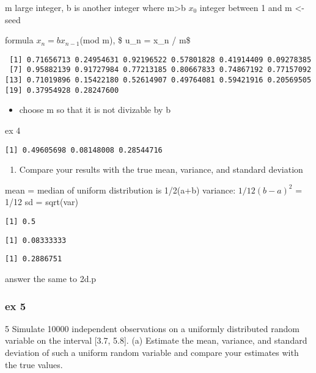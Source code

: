 \documentclass[
  letterpaper,
  DIV=11,
  numbers=noendperiod]{scrreprt}
\providecommand{\tightlist}{%
  \setlength{\itemsep}{0pt}\setlength{\parskip}{0pt}}\usepackage{longtable,booktabs,array}
\begin{document}
m large integer, b is another integer where m\textgreater b \(x_0\)
integer between 1 and m \textless- seed

formula \(x_n = bx_{n-1}\)(mod m), \$ u\_n = x\_n / m\$

\begin{verbatim}
 [1] 0.71656713 0.24954631 0.92196522 0.57801828 0.41914409 0.09278385
 [7] 0.95882139 0.91727984 0.77213185 0.80667833 0.74867192 0.77157092
[13] 0.71019896 0.15422180 0.52614907 0.49764081 0.59421916 0.20569505
[19] 0.37954928 0.28247600
\end{verbatim}

\begin{itemize}
\tightlist
\item
  choose m so that it is not divizable by b
\end{itemize}

ex 4

\begin{verbatim}
[1] 0.49605698 0.08148008 0.28544716
\end{verbatim}

\begin{enumerate}
\def\labelenumi{(\alph{enumi})}
\setcounter{enumi}{1}
\tightlist
\item
  Compare your results with the true mean, variance, and standard
  deviation
\end{enumerate}

mean = median of uniform distribution is 1/2(a+b) variance:
\(1/12(b-a)^2\) = 1/12 sd = sqrt(var)

\begin{verbatim}
[1] 0.5
\end{verbatim}

\begin{verbatim}
[1] 0.08333333
\end{verbatim}

\begin{verbatim}
[1] 0.2886751
\end{verbatim}

answer the same to 2d.p

\subsubsection{ex 5}\label{ex-5}

5 Simulate 10000 independent observations on a uniformly distributed
random variable on the interval {[}3.7, 5.8{]}. (a) Estimate the mean,
variance, and standard deviation of such a uniform random variable and
compare your estimates with the true values.
\end{document}
